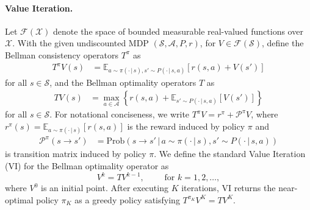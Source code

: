 \documentclass{article} %
\newcommand{\cA}{\mathcal{A}}
\newcommand{\cS}{\mathcal{S}}
\newcommand{\cF}{\mathcal{F}}
\newcommand{\cP}{\mathcal{P}}
\newcommand{\cX}{\mathcal{X}}
\begin{document}
 \paragraph{Value Iteration.}
  Let $\cF(\cX)$ denote the space of bounded measurable real-valued functions over $\cX$. With the given undiscounted MDP $(\cS, \cA, P, r)$, for $V \in \cF(\cS)$, define the Bellman consistency operators $T^{\pi}$ as
\begin{align*}
T^{\pi}V(s)&=\mathbb{E}_{a \sim \pi(\cdot\,|\,s), s'\sim P(\cdot\,|\,s,a) }\left[r(s,a)+ V(s')\right]
\end{align*}
for all $s \in \cS$, and the Bellman optimality operators $T$ as
\begin{align*}
TV(s)&=\max_{a \in \cA} \left\{r(s,a)+\mathbb{E}_{s'\sim P(\cdot\,|\,s,a) }\left[V(s')\right]\right\}
\end{align*}
for all $s \in \cS$. For notational conciseness, we write $T^{\pi}V=r^{\pi}+\cP^{\pi}V$, where $r^{\pi}(s)=\mathbb{E}_{a \sim \pi(\cdot\,|\,s) }\left[r(s,a)\right]$ is the reward induced by policy $\pi$ and 
\begin{align*}
    \cP^{\pi}(s\rightarrow s')&=
\mathrm{Prob}(s\rightarrow s'\,|\,
a \sim \pi(\cdot\,|\,s), s'\sim P(\cdot\,|\,s,a))
\end{align*}
is transition matrix induced by policy $\pi$. We define the standard Value Iteration (VI) for the Bellman optimality operator as 
\[ V^{k}=TV^{k-1}, \qquad\text{ for } k=1,2,\dots,\]
 where $V^0$ is an initial point. After executing $K$ iterations, VI returns the near-optimal policy $\pi_K$ as a greedy policy satisfying $T^{\pi_K}V^K= TV^K.$

\end{document}
